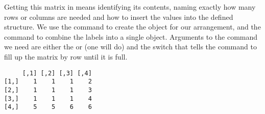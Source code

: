 Getting this matrix in \R{} means identifying its contents, naming exactly how many rows or columns are needed and how to insert the values into the defined structure. We use the  command to create the object for our arrangement, and the  command to combine the labels into a single object. Arguments to the  command we need are either the  or  (one will do) and the  switch that tells the  command to fill up the matrix by row until it is full. 
\begin{knitrout}
\color{fgcolor}\begin{kframe}
\begin{alltt}
\hlstd{> } \hlkwb{=} \hlstd{(}\hlstd{(}\hlstd{,}\hlstd{,}\hlstd{,}\hlstd{,}\hlstd{,}\hlstd{,}\hlstd{,}\hlstd{,}\hlstd{,}\hlstd{,}\hlstd{,}\hlstd{,}\hlstd{,}\hlstd{,}\hlstd{,}\hlstd{),} \hlstd{=}\hlstd{,} \hlstd{=}\hlstd{)}
\hlstd{> }
\end{alltt}
\begin{verbatim}
     [,1] [,2] [,3] [,4]
[1,]    1    1    1    2
[2,]    1    1    1    3
[3,]    1    1    1    4
[4,]    5    5    6    6
\end{verbatim}
\end{kframe}
\end{knitrout}
 
